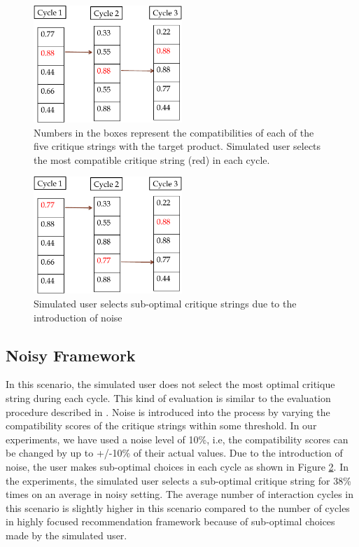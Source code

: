 \begin{figure}[h]
  \centering
  \captionsetup{justification=centering}
    \includegraphics[width=0.5\textwidth]{figures-bharath/focus.pdf}
  \caption{Numbers in the boxes represent the compatibilities of each of the five critique strings with the target product. Simulated user selects the most compatible critique string (red) in each cycle.}
\label{fig:focus}
\end{figure}

\begin{figure}[h]
  \centering
  \captionsetup{justification=centering}
    \includegraphics[width=0.5\textwidth]{figures-bharath/noisy.pdf}
  \caption{Simulated user selects sub-optimal critique strings due to the introduction of noise}
\label{fig:noisy}
\end{figure}

\subsection{Noisy Framework}
\label{sec:noisy}
In this scenario, the simulated user does not select the most optimal critique string during each cycle.
This kind of evaluation is similar to the evaluation procedure described in \cite{suggestion}.
Noise is introduced into the process by varying the compatibility scores of the critique strings within some threshold. 
In our experiments, we have used a noise level of 10\%, i.e, the compatibility scores can be changed by up to +/-10\% of their actual values.
Due to the introduction of noise, the user makes sub-optimal choices in each cycle as shown in Figure \ref{fig:noisy}.
In the experiments, the simulated user selects a sub-optimal critique string for 38\% times on an average in noisy setting.
The average number of interaction cycles in this scenario is slightly higher in this scenario compared to the number of cycles in highly focused recommendation framework because of sub-optimal choices made by the simulated user.


